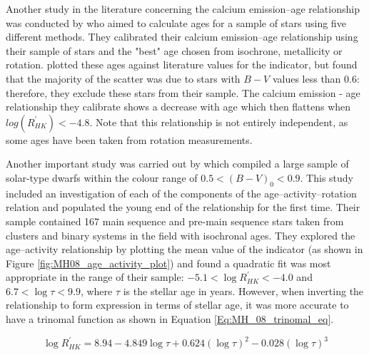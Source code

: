 Another study in the literature concerning the calcium emission--age relationship was conducted by \citet{Lachaume_etal_1999} who aimed to calculate ages for a sample of stars using five different methods. They calibrated their calcium emission--age relationship using their sample of stars and the "best" age chosen from isochrone, metallicity or rotation. \citet{Lachaume_etal_1999} plotted these ages against literature values for the \Rprime indicator, but found that the majority of the scatter was due to stars with $B - V$ values less than 0.6: therefore, they exclude these stars from their sample. The calcium emission - age relationship they calibrate shows a decrease with age which then flattens when $log(R^{'}_{HK}) < -4.8$. Note that this relationship is not entirely independent, as some ages have been taken from rotation measurements.

Another important study was carried out by \citet{Mamajek_Hillenbrand_2008} which compiled a large sample of solar-type dwarfs within the colour range of $0.5 < (B-V)_{0} < 0.9$. This study included an investigation of each of the components of the age--activity--rotation relation and populated the young end of the relationship for the first time. Their sample contained 167 main sequence and pre-main sequence stars taken from clusters and binary systems in the field with isochronal ages. They explored the age--activity relationship by plotting the mean value of the \Rprime indicator (as shown in Figure \ref{fig:MH08_age_activity_plot}) and found a quadratic fit was most appropriate in the range of their sample: $-5.1 < \log R^{'}_{HK} < -4.0$ and $6.7 < \log\tau < 9.9$, where $\tau$ is the stellar age in years. However, when inverting the relationship to form expression in terms of stellar age, it was more accurate to have a trinomal function as shown in Equation \ref{Eq:MH_08_trinomal_eq}.

\begin{equation}
    \log R^{'}_{HK} = 8.94 - 4.849\log\tau + 0.624(\log\tau)^{2} - 0.028(\log\tau)^{3}
    \label{Eq:MH_08_trinomal_eq}
\end{equation}

